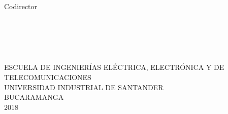 \noindent \begin{center}
{\large Codirector }\\
{\Large \textsc{\insertcodirector} }\textbf{\large }\\
{\large \insertcargocodirector}
\par\end{center}{\large \par}


\noindent \begin{center}
\textbf{\large ~}
\par\end{center}{\large \par}

\noindent \begin{center}
\textbf{\large ~}
\par\end{center}{\large \par}


\noindent \begin{center}
{\large ESCUELA DE INGENIERÍAS ELÉCTRICA, ELECTRÓNICA Y DE TELECOMUNICACIONES
}\\
{\large UNIVERSIDAD INDUSTRIAL DE SANTANDER}\\
{\large BUCARAMANGA}\\
{\large 2018}
\par\end{center}{\large \par}

